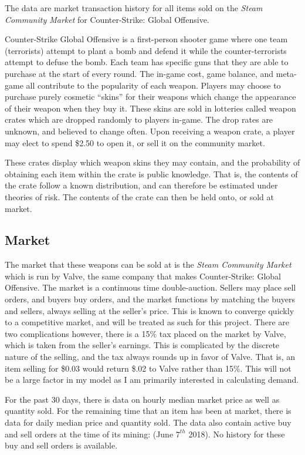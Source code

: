\documentclass[12pt]{paper}
\begin{document}
The data are market transaction history for all items sold on the
\emph{Steam Community Market} for Counter-Strike: Global
Offensive.

Counter-Strike Global Offensive is a first-person shooter game where
one team (terrorists) attempt to plant a bomb and defend it while the
counter-terrorists attempt to defuse the bomb. Each team has specific
guns that they are able to purchase at the start of every round. The
in-game cost, game balance, and meta-game all contribute to the
popularity of each weapon. Players may choose to purchase purely
cosmetic ``skins'' for their weapons which change the appearance of
their weapon when they buy it. These skins are sold in lotteries
called weapon crates which are dropped randomly to players
in-game. The drop rates are unknown, and believed to change
often. Upon receiving a weapon crate, a player may elect to spend
\$2.50 to open it, or sell it on the community market.

These crates display which weapon skins they may contain, and the
probability of obtaining each item within the crate is public
knowledge. That is, the contents of the crate follow a known
distribution, and can therefore be estimated under theories of
risk. The contents of the crate can then be held onto, or sold at
market.

\subsection{Market}


The market that these weapons can be sold at is the \emph{Steam
  Community Market} which is run by Valve, the same company that makes
Counter-Strike: Global Offensive. The market is a continuous time
double-auction. Sellers may place sell orders, and buyers buy orders,
and the market functions by matching the buyers and sellers, always
selling at the seller's price. This is known to converge quickly to a
competitive market, and will be treated as such for this
project. \cite{Efficiency} There are two complications however, there is a 15\% tax
placed on the market by Valve, which is taken from the seller's
earnings. This is complicated by the discrete nature of the selling,
and the tax always rounds up in favor of Valve. That is, an item
selling for \$0.03 would return \$.02 to Valve rather than 15\%. This
will not be a large factor in my model as I am primarily interested in
calculating demand.

For the past 30 days, there is data on hourly median market price as
well as quantity sold. For the remaining time that an item has been at
market, there is data for daily median price and quantity sold. The
data also contain active buy and sell orders at the time of its
mining: (June $7^{th}$ 2018). No history for these buy and sell orders
is available.
\end{document}
